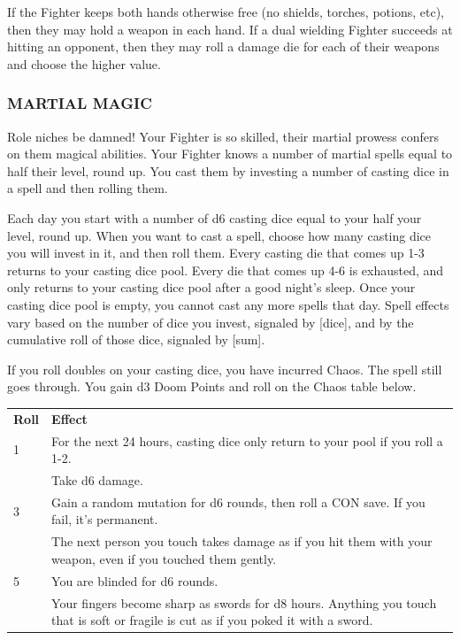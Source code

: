 \documentclass[twoside]{article}
\begin{document}
If the Fighter keeps both hands otherwise free (no shields, torches, potions, etc), then they may hold a weapon in each hand. If a dual wielding Fighter succeeds at hitting an opponent, then they may roll a damage die for each of their weapons and choose the higher value.

\subsubsection*{\footnotesize{M}\scriptsize{ARTIAL} \footnotesize{M}\scriptsize{AGIC}\normalsize}

Role niches be damned! Your Fighter is so skilled, their martial prowess confers on them magical abilities. Your Fighter knows a number of martial spells equal to half their level, round up. You cast them by investing a number of casting dice in a spell and then rolling them. 

\bigbreak

Each day you start with a number of d6 casting dice equal to your half your level, round up. When you want to cast a spell, choose how many casting dice you will invest in it, and then roll them. Every casting die that comes up 1-3 returns to your casting dice pool. Every die that comes up 4-6 is exhausted, and only returns to your casting dice pool after a good night's sleep. Once your casting dice pool is empty, you cannot cast any more spells that day. Spell effects vary based on the number of dice you invest, signaled by [dice], and by the cumulative roll of those dice, signaled by [sum].

\bigbreak

If you roll doubles on your casting dice, you have incurred Chaos. The spell still goes through. You gain d3 Doom Points and roll on the Chaos table below.

\bigbreak

\begin{center}
\noindent\begin{tabular}{>{\centering\arraybackslash}p{}p{}}
\textbf{Roll}&\textbf{Effect}\\
\rowcolor[gray]{0.75}1&For the next 24 hours, casting dice only return to your pool if you roll a 1-2.\\
2&Take d6 damage.\\
\rowcolor[gray]{0.75}3&Gain a random mutation for d6 rounds, then roll a CON save. If you fail, it's permanent.\\
4&The next person you touch takes damage as if you hit them with your weapon, even if you touched them gently.\\
\rowcolor[gray]{0.75}5&You are blinded for d6 rounds.\\
6&Your fingers become sharp as swords for d8 hours. Anything you touch that is soft or fragile is cut as if you poked it with a sword.\\
\end{tabular}
\end{center}
\end{document}

